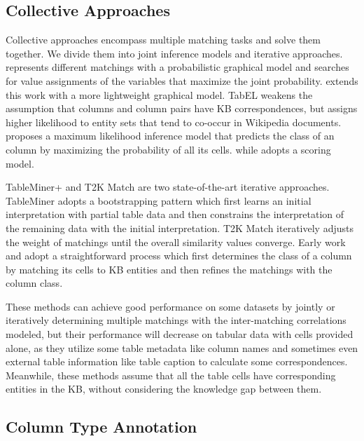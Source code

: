 \documentclass[letterpaper]{article}
\newcommand{\rv}[1]{{\color{black}#1}}
\newcommand{\camera}[1]{{\color{black}#1}}
\begin{document}
\subsection{Collective Approaches}
Collective approaches encompass multiple matching tasks and solve them together.
We divide them into joint inference models and iterative approaches.
\cite{limaye2010annotating}
\camera{
represents} different matchings with a probabilistic graphical model and
searches for \rv{value assignments of the variables that maximize} the joint probability.
\cite{mulwad2013semantic} extends this work with a more lightweight graphical model.
TabEL \cite{bhagavatula2015tabel} weakens the assumption that columns and column pairs \rv{have KB correspondences}, 
but assigns higher likelihood to entity sets that tend to co-occur in Wikipedia documents.
\cite{venetis2011recovering} proposes a maximum likelihood inference model \rv{that predicts the class of an column by maximizing the probability of all its cells.}
while \cite{chu2015katara} adopts a scoring model.


TableMiner+ \cite{zhang2014towards,zhang2017effective} and T2K Match \cite{ritze2015matching} are two state-of-the-art iterative approaches.
TableMiner adopts a bootstrapping pattern 
which first learns an initial interpretation with partial table data
and then constrains the interpretation of the \camera{remaining} data with the initial interpretation.
T2K Match iteratively adjusts the weight of matchings until the overall similarity values converge.
Early work \cite{syed2010exploiting} and \cite{mulwad2010using} adopt a straightforward process which first determines the class of a column by matching its cells to KB entities and then refines the matchings with the column class.

These methods can achieve good performance on some datasets by jointly or iteratively determining multiple matchings with the inter-matching correlations modeled,
but their performance will decrease on tabular data with cells provided alone,
as they utilize some table metadata like column names and sometimes even external table information like table caption \rv{to calculate some correspondences}.
Meanwhile, these methods assume that all the table cells have corresponding entities in the KB,
without considering the \rv{knowledge gap} between them.

\subsection{Column Type Annotation}
\end{document}
